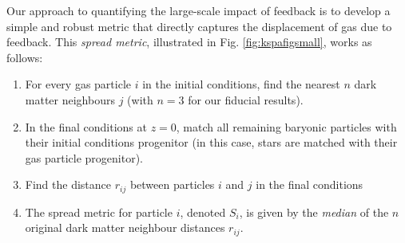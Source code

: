 Our approach to quantifying the large-scale impact of feedback is to develop
a simple and robust metric that directly captures the displacement of gas
due to feedback. This {\it spread metric}, illustrated in Fig.
\ref{fig:kspafigsmall}, works as follows:

\begin{enumerate} 
	\item For every gas particle $i$ in the initial conditions, find the nearest
          $n$ dark matter neighbours $j$ (with $n=3$ for our fiducial results).
	\item In the final conditions at $z=0$, match all remaining baryonic particles
	      with their initial conditions progenitor (in this case, stars are
	      matched with their gas particle progenitor).
    \item Find the distance $r_{ij}$ between particles $i$ and $j$ in the
          final conditions
    \item The spread metric for particle $i$, denoted $S_{i}$, is given by the \emph{median}
          of the $n$ original dark matter neighbour distances $r_{ij}$.
\end{enumerate}

